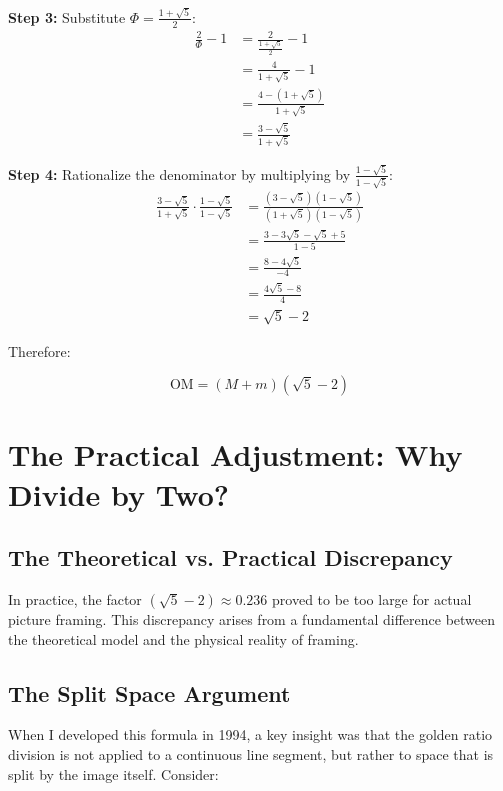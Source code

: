 \documentclass[12pt,a4paper]{article}
\begin{document}
\textbf{Step 3:} Substitute $\Phi = \frac{1 + \sqrt{5}}{2}$:
\begin{align}
  \frac{2}{\Phi} - 1 &= \frac{2}{\frac{1 + \sqrt{5}}{2}} - 1 \\
  &= \frac{4}{1 + \sqrt{5}} - 1 \\
  &= \frac{4 - (1 + \sqrt{5})}{1 + \sqrt{5}} \\
  &= \frac{3 - \sqrt{5}}{1 + \sqrt{5}}
\end{align}

\textbf{Step 4:} Rationalize the denominator by multiplying by $\frac{1 - \sqrt{5}}{1 - \sqrt{5}}$:
\begin{align}
  \frac{3 - \sqrt{5}}{1 + \sqrt{5}} \cdot \frac{1 - \sqrt{5}}{1 - \sqrt{5}} &= \frac{(3 - \sqrt{5})(1 - \sqrt{5})}{(1 + \sqrt{5})(1 - \sqrt{5})} \\
  &= \frac{3 - 3\sqrt{5} - \sqrt{5} + 5}{1 - 5} \\
  &= \frac{8 - 4\sqrt{5}}{-4} \\
  &= \frac{4\sqrt{5} - 8}{4} \\
  &= \sqrt{5} - 2
\end{align}

Therefore:

\begin{equation}
  \text{OM} = (M + m)(\sqrt{5} - 2)
  \label{OM3}
\end{equation}

\section{The Practical Adjustment: Why Divide by Two?}

\subsection{The Theoretical vs. Practical Discrepancy}

In practice, the factor $(\sqrt{5} - 2) \approx 0.236$ proved to be too large for actual picture framing. This discrepancy arises from a fundamental difference between the theoretical model and the physical reality of framing.

\subsection{The Split Space Argument}

When I developed this formula in 1994, a key insight was that the golden ratio division is not applied to a continuous line segment, but rather to space that is split by the image itself. Consider:
\end{document}
